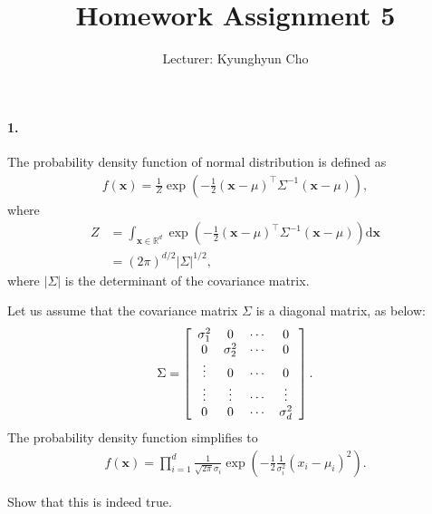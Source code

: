 \documentclass{article}
\newcommand{\vect}[1]{\mathbf{#1}}
\newcommand{\vx}[0]{\vect{x}}
\newcommand{\RR}[0]{\mathbb{R}}
\newcommand{\dd}[1]{\ensuremath{\mbox{d}#1}}
\begin{document}
\title{Homework Assignment 5}
\author{Lecturer: Kyunghyun Cho}

\maketitle
{}

\paragraph{1.} 

The probability density function of normal distribution is defined as 
\begin{align*}
    f(\vx) = \frac{1}{Z} \exp\left( 
        -\frac{1}{2} (\vx - \mu)^\top \Sigma^{-1} (\vx - \mu)
    \right),
\end{align*}
where 
\begin{align*}
    Z &= \int_{\vx \in \RR^d} \exp\left( 
        -\frac{1}{2} (\vx - \mu)^\top \Sigma^{-1} (\vx - \mu)
    \right) \dd \vx \\
    &= (2\pi)^{d/2} |\Sigma|^{1/2},
\end{align*}
where $|\Sigma|$ is the determinant of the covariance matrix.

Let us assume that the covariance matrix $\Sigma$ is a diagonal matrix, as
below:
\begin{align*}
    \Sigma = \left[
        \begin{array}{c c c c}
            \sigma_1^2 & 0 & \cdots & 0 \\
            0 & \sigma_2^2 & \cdots & 0 \\
            \vdots & 0 & \cdots & 0 \\
            \vdots & \vdots & \cdots & \vdots \\
            0 & 0 & \cdots & \sigma_d^2 
        \end{array}
    \right].
\end{align*}
The probability density function simplifies to
\begin{align*}
    f(\vx) = \prod_{i=1}^d 
    \frac{1}{\sqrt{2\pi} \sigma_i}
    \exp\left(
        -\frac{1}{2} \frac{1}{\sigma_i^2}(x_i - \mu_i)^2
    \right).
\end{align*}

Show that this is indeed true.
\end{document}
